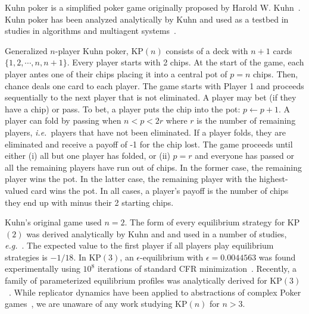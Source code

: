 \documentclass{aamas2014}
\newcommand{\ie}{{\it i.e.}}
\newcommand{\eg}{{\it e.g.}}
\begin{document}

Kuhn poker is a simplified poker game originally proposed by Harold W. Kuhn~\cite{Kuhn50}. 
Kuhn poker has been analyzed analytically by Kuhn and used as a testbed in studies in 
algorithms and multiagent systems~\cite{hoehn05,AbouRisk10,Szafron13Kuhn}.  

Generalized $n$-player Kuhn poker, KP$(n)$ consists of a deck with $n+1$ cards $\{ 1, 2, \cdots, n, n+1 \}$. 
Every player starts with 2 chips. At the start of the game, each player antes one of their chips placing it
into a central pot of $p = n$ chips. 
Then, chance deals one card to each player.
The game starts with Player 1 and proceeds sequentially to the next player that is not eliminated. 
A player may bet (if they have a chip) or pass. 
To bet, a player puts the chip into the pot: $p \leftarrow p + 1$. 
A player can fold by passing when $n < p < 2r$ where $r$ is the number of remaining players, \ie~players that have not been eliminated. 
If a player folds, they are eliminated and receive a payoff of -1 for the chip lost. 
The game proceeds until either (i) all but one player has folded, or (ii) $p = r$ and everyone has passed or all the 
remaining players have run out of chips. 
In the former case, the remaining player wins the pot. In the latter case, the 
remaining player with the highest-valued card wins the pot. In all cases, a player's payoff is the number of chips
they end up with minus their 2 starting chips. 

Kuhn's original game used $n = 2$. The form of every equilibrium strategy for KP$(2)$ was derived analytically
by Kuhn and and used in a number of studies, \eg~\cite{hoehn05}. 
The expected value to the first player if all players play equilibrium strategies is $-1/18$. 
In KP$(3)$, an $\epsilon$-equilibrium with $\epsilon = 0.0044563$ was 
found experimentally using $10^8$ iterations of standard CFR minimization~\cite{AbouRisk10}. 
Recently, a family of parameterized equilibrium profiles was analytically derived for KP$(3)$~\cite{Szafron13Kuhn}.
While replicator dynamics have been applied to abstractions of complex Poker games~\cite{ponsen09b},
we are unaware of any work studying KP$(n)$ for $n > 3$.
\end{document}
